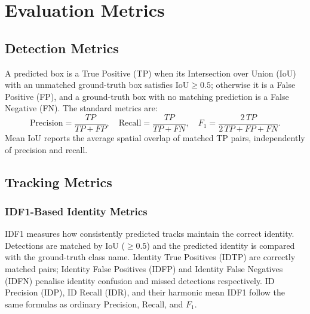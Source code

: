 \section{Evaluation Metrics}\label{sec:evaluation}

\subsection{Detection Metrics}
A predicted box is a True Positive (TP) when its Intersection over Union (IoU) with
an unmatched ground-truth box satisfies $\mathrm{IoU} \geq 0.5$; otherwise it is a
False Positive (FP), and a ground-truth box with no matching prediction is a False
Negative (FN).
The standard metrics are:
\begin{equation}
  \mathrm{Precision} = \frac{TP}{TP+FP}, \quad
  \mathrm{Recall} = \frac{TP}{TP+FN}, \quad
  F_1 = \frac{2\,TP}{2\,TP+FP+FN}.
\end{equation}
Mean IoU reports the average spatial overlap of matched TP pairs, independently of
precision and recall.

\subsection{Tracking Metrics}

\subsubsection{IDF1-Based Identity Metrics}
IDF1 measures how consistently predicted tracks maintain the correct identity.
Detections are matched by IoU ($\geq 0.5$) and the predicted identity is compared
with the ground-truth class name.
Identity True Positives (IDTP) are correctly matched pairs; Identity False Positives
(IDFP) and Identity False Negatives (IDFN) penalise identity confusion and missed
detections respectively.
ID Precision (IDP), ID Recall (IDR), and their harmonic mean IDF1 follow the same
formulas as ordinary Precision, Recall, and $F_1$.

